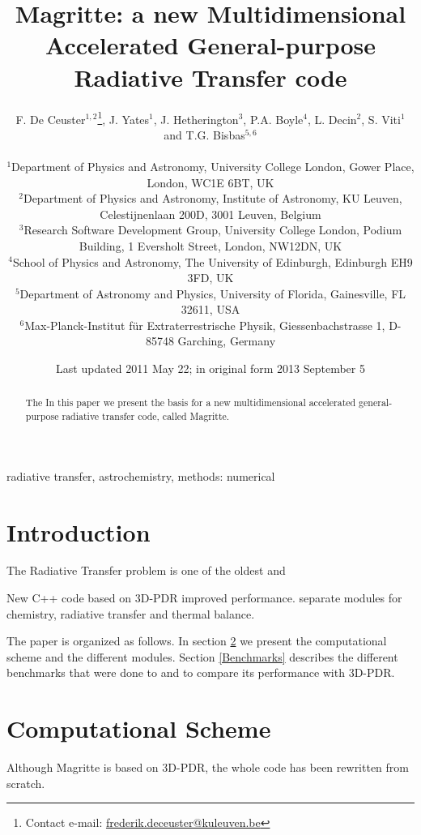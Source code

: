 \documentclass[a4paper,fleqn,usenatbib]{mnras}
\title[Magritte]{Magritte: a new Multidimensional Accelerated General-purpose Radiative Transfer code}
\author[F. De Ceuster]{ F. De Ceuster$^{1,2}$\thanks{Contact e-mail: \href{frederik.deceuster@kuleuven.be}{frederik.deceuster@kuleuven.be}}, J. Yates$^{1}$, J. Hetherington$^{3}$, P.A. Boyle$^{4}$, L. Decin$^{2}$, S. Viti$^{1}$ and T.G. Bisbas$^{5,6}$
\\ \\
$^{1}$Department of Physics and Astronomy, University College London, Gower Place, London, WC1E 6BT, UK \\
$^{2}$Department of Physics and Astronomy, Institute of Astronomy, KU Leuven, Celestijnenlaan 200D, 3001 Leuven, Belgium \\
$^{3}$Research Software Development Group, University College London, Podium Building, 1 Eversholt Street, London, NW12DN, UK \\
$^{4}$School of Physics and Astronomy, The University of Edinburgh, Edinburgh EH9 3FD, UK \\
$^{5}$Department of Astronomy and Physics, University of Florida, Gainesville, FL 32611, USA \\
$^{6}$Max-Planck-Institut f\"ur Extraterrestrische Physik, Giessenbachstrasse 1, D-85748 Garching, Germany}
\date{Last updated 2011 May 22; in original form 2013 September 5}
\begin{document}
\label{firstpage}
\pagerange{\pageref{firstpage}--\pageref{lastpage}}
\maketitle

\begin{abstract}
The  In this paper we present the basis for a new multidimensional accelerated general-purpose radiative transfer code, called Magritte.
\end{abstract}

\begin{keywords}
radiative transfer, astrochemistry, methods: numerical
\end{keywords}



\begingroup
\let\clearpage\relax
\endgroup
\newpage


\section{Introduction}

The Radiative Transfer problem is one of the oldest and

New C++ code based on 3D-PDR \citet{Bisbas2012} improved performance. separate modules for chemistry, radiative transfer and thermal balance.

The paper is organized as follows. In section \ref{CompSc} we present the computational scheme and the different modules. Section \ref{Benchmarks} describes the different benchmarks that were done to and to compare its performance with 3D-PDR.


\section{Computational Scheme}
\label{CompSc}

Although Magritte is based on 3D-PDR, the whole code has been rewritten from scratch.
\end{document}

